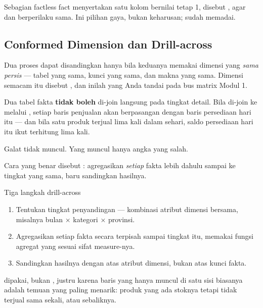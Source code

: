 Sebagian factless fact menyertakan satu kolom bernilai tetap 1, disebut
, agar  dan  berperilaku sama.
Ini pilihan gaya, bukan keharusan;  sudah memadai.

\subsection{Conformed Dimension dan Drill-across}

Dua proses dapat disandingkan hanya bila keduanya memakai dimensi yang
\emph{sama persis} --- tabel yang sama, kunci yang sama, dan makna yang sama.
Dimensi semacam itu disebut , dan inilah yang
Anda tandai pada bus matrix Modul 1.

\begin{peringatan}
Dua tabel fakta \textbf{tidak boleh} di-join langsung pada tingkat detail.
Bila  di-join ke
 melalui , setiap baris penjualan akan berpasangan dengan baris persediaan hari
itu --- dan bila satu produk terjual lima kali dalam sehari, saldo persediaan
hari itu ikut terhitung lima kali.

Galat tidak muncul. Yang muncul hanya angka yang salah.
\end{peringatan}

Cara yang benar disebut : agregasikan \emph{setiap} fakta
lebih dahulu sampai ke tingkat yang sama, baru sandingkan hasilnya.

\begin{konsep}{Tiga langkah drill-across}
\begin{enumerate}[leftmargin=1.4em]
  \item Tentukan tingkat penyandingan --- kombinasi atribut dimensi bersama,
        misalnya bulan $\times$ kategori $\times$ provinsi.
  \item Agregasikan setiap fakta secara terpisah sampai tingkat itu, memakai
        fungsi agregat yang sesuai sifat measure-nya.
  \item Sandingkan hasilnya dengan  atas atribut
        dimensi, bukan atas kunci fakta.
\end{enumerate}
\end{konsep}

 dipakai, bukan , justru karena
baris yang hanya muncul di satu sisi biasanya adalah temuan yang paling
menarik: produk yang ada stoknya tetapi tidak terjual sama sekali, atau
sebaliknya.

